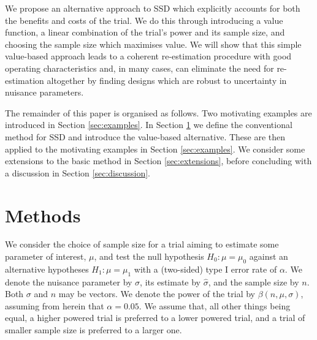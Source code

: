 \documentclass[sagev, Crown]{sagej}
\begin{document}

We propose an alternative approach to SSD which explicitly accounts for both the benefits and costs of the trial. We do this through introducing a value function, a linear combination of the trial's power and its sample size, and choosing the sample size which maximises value. We will show that this simple value-based approach leads to a coherent re-estimation procedure with good operating characteristics and, in many cases, can eliminate the need for re-estimation altogether by finding designs which are robust to uncertainty in nuisance parameters.

The remainder of this paper is organised as follows. Two motivating examples are introduced in Section \ref{sec:examples}. In Section \ref{sec:methods} we define the conventional method for SSD and introduce the value-based alternative. These are then applied to the motivating examples in Section \ref{sec:examples}. We consider some extensions to the basic method in Section \ref{sec:extensions}, before concluding with a discussion in Section \ref{sec:discussion}.

\section{Methods}\label{sec:methods}

We consider the choice of sample size for a trial aiming to estimate some parameter of interest, $\mu$, and test the null hypothesis $H_0: \mu = \mu_0$ against an alternative hypotheses $H_1: \mu = \mu_1$ with a (two-sided) type I error rate of $\alpha$. We denote the nuisance parameter by $\sigma$, its estimate by $\hat{\sigma}$, and the sample size by $n$. Both $\sigma$ and $n$ may be vectors. We denote the power of the trial by $\beta(n, \mu, \sigma)$, assuming from herein that $\alpha = 0.05$. We assume that, all other things being equal, a higher powered trial is preferred to a lower powered trial, and a trial of smaller sample size is preferred to a larger one. 
\end{document}
